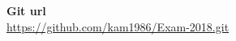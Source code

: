 \documentclass[a4paper]{article}
\begin{document}
\maketitle

\begin{center}
	\textbf{Git url}\\
	\url{https://github.com/kam1986/Exam-2018.git}
\end{center}

\newpage
















\end{document}
